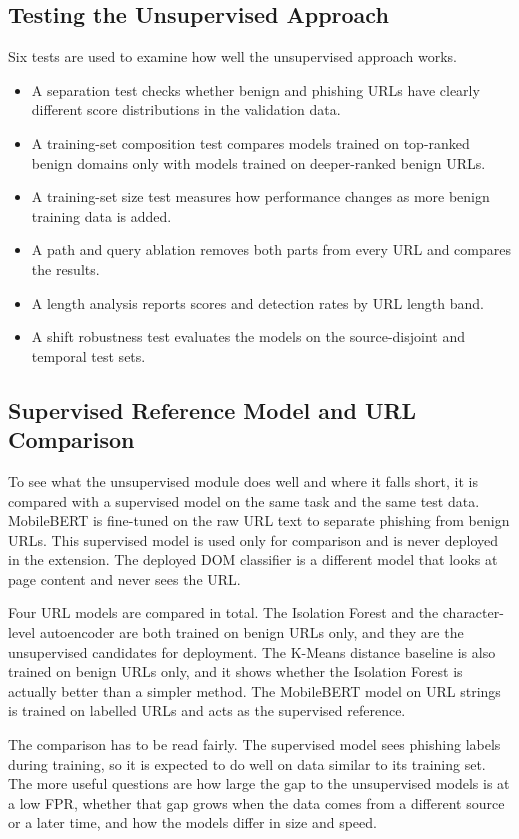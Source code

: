 \documentclass{FastFyp}
\begin{document}
\subsection{Testing the Unsupervised Approach}
Six tests are used to examine how well the unsupervised approach works.
\begin{itemize}
    \item A separation test checks whether benign and phishing URLs have clearly different score distributions in the validation data.
    \item A training-set composition test compares models trained on top-ranked benign domains only with models trained on deeper-ranked benign URLs.
    \item A training-set size test measures how performance changes as more benign training data is added.
    \item A path and query ablation removes both parts from every URL and compares the results.
    \item A length analysis reports scores and detection rates by URL length band.
    \item A shift robustness test evaluates the models on the source-disjoint and temporal test sets.
\end{itemize}

\subsection{Supervised Reference Model and URL Comparison}
\label{sec:url-comparison}
To see what the unsupervised module does well and where it falls short, it is compared with a supervised model on the same task and the same test data. MobileBERT is fine-tuned on the raw URL text to separate phishing from benign URLs. This supervised model is used only for comparison and is never deployed in the extension. The deployed DOM classifier is a different model that looks at page content and never sees the URL.

Four URL models are compared in total. The Isolation Forest and the character-level autoencoder are both trained on benign URLs only, and they are the unsupervised candidates for deployment. The K-Means distance baseline is also trained on benign URLs only, and it shows whether the Isolation Forest is actually better than a simpler method. The MobileBERT model on URL strings is trained on labelled URLs and acts as the supervised reference.

The comparison has to be read fairly. The supervised model sees phishing labels during training, so it is expected to do well on data similar to its training set. The more useful questions are how large the gap to the unsupervised models is at a low FPR, whether that gap grows when the data comes from a different source or a later time, and how the models differ in size and speed.
\end{document}
